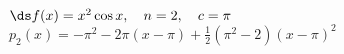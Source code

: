{$\ds f(x) = x^2\cos x, \quad n=2, \quad c=\pi$
}
{$p_2(x) =-\pi ^2-2 \pi  (x-\pi)+\frac{1}{2} \left(\pi ^2-2\right)
   (x-\pi)^2$
}